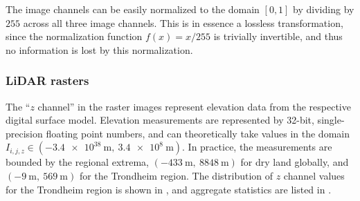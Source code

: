 The image channels can be easily normalized to the domain $[0, 1]$ by dividing by $255$ across all three image channels.
This is in essence a lossless transformation, since the normalization function $f(x) = x/255$ is trivially invertible, and thus no information is lost by this normalization.

\subsubsection*{LiDAR rasters}

The \enquote{$z$ channel} in the raster images represent elevation data from the respective digital surface model.
Elevation measurements are represented by 32-bit, single-precision floating point numbers, and can theoretically take values in the domain $I_{i,j,z} \in (\SI{-3.4e38}{\meter},~\SI{3.4e8}{\meter})$.
In practice, the measurements are bounded by the regional extrema, $(\SI{-433}{\meter},~\SI{8848}{\meter})$ for dry land globally, and $(\SI{-9}{\meter},~\SI{569}{\meter})$ for the Trondheim region.
The distribution of $z$ channel values for the Trondheim region is shown in , and aggregate statistics are listed in .

\begin{figure}[htb]
  \begin{floatrow}
  \end{floatrow}
\end{figure}

